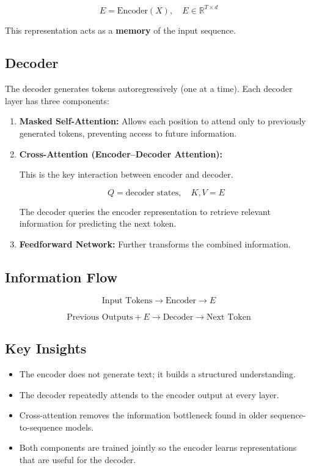 \documentclass[12pt]{extarticle}
\begin{document}
\[
E = \text{Encoder}(X), \quad E \in \mathbb{R}^{T \times d}
\]

This representation acts as a \textbf{memory} of the input sequence.

\subsection{Decoder}

The decoder generates tokens autoregressively (one at a time). Each decoder layer has three components:

\begin{enumerate}

\item \textbf{Masked Self-Attention:}  
Allows each position to attend only to previously generated tokens, preventing access to future information.

\item \textbf{Cross-Attention (Encoder--Decoder Attention):}  

This is the key interaction between encoder and decoder.

\[
Q = \text{decoder states}, \quad K,V = E
\]

The decoder queries the encoder representation to retrieve relevant information for predicting the next token.

\item \textbf{Feedforward Network:}  
Further transforms the combined information.

\end{enumerate}

\subsection*{Information Flow}

\[
\text{Input Tokens} \rightarrow \text{Encoder} \rightarrow E
\]

\[
\text{Previous Outputs} + E \rightarrow \text{Decoder} \rightarrow \text{Next Token}
\]


\subsection*{Key Insights}

\begin{itemize}
\item The encoder does not generate text; it builds a structured understanding.
\item The decoder repeatedly attends to the encoder output at every layer.
\item Cross-attention removes the information bottleneck found in older sequence-to-sequence models.
\item Both components are trained jointly so the encoder learns representations that are useful for the decoder.
\end{itemize}
\end{document}
